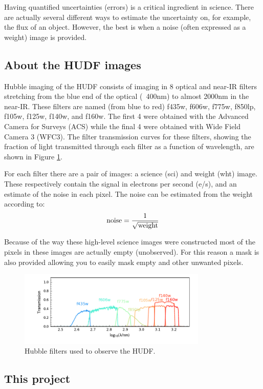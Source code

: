 \documentclass{article}
\begin{document}
Having quantified uncertainties (errors) is a critical ingredient in science. There are actually several different ways to estimate the uncertainty on, for example, the flux of an object. However, the best is when a noise (often expressed as a weight) image is provided.

\subsection*{About the HUDF images}

Hubble imaging of the HUDF consists of imaging in 8 optical and near-IR filters stretching from the blue end of the optical (~400nm) to almost 2000nm in the near-IR. These filters are named (from blue to red) f435w, f606w, f775w, f850lp, f105w, f125w, f140w, and f160w. The first 4 were obtained with the Advanced Camera for Surveys (ACS) while the final 4 were obtained with Wide Field Camera 3 (WFC3). The filter transmission curves for these filters, showing the fraction of light transmitted through each filter as a function of wavelength, are shown in Figure \ref{fig:filters}.

For each filter there are a pair of images: a science (sci) and weight (wht) image. These respectively contain the signal in electrons per second (e/s), and an estimate of the noise in each pixel. The noise can be estimated from the weight according to:
\[
{\rm noise} = \frac{1}{\sqrt{\rm weight}}
\]

Because of the way these high-level science images were constructed most of the pixels in these images are actually empty (unobserved). For this reason a mask is also provided allowing you to easily mask empty and other unwanted pixels.

\begin{figure}\label{fig:filters}
	\centering
	\includegraphics[width=0.8\textwidth]{../utility/filters.pdf}
	\caption{Hubble filters used to observe the HUDF.}
\end{figure}


\subsection*{This project}
\end{document}
